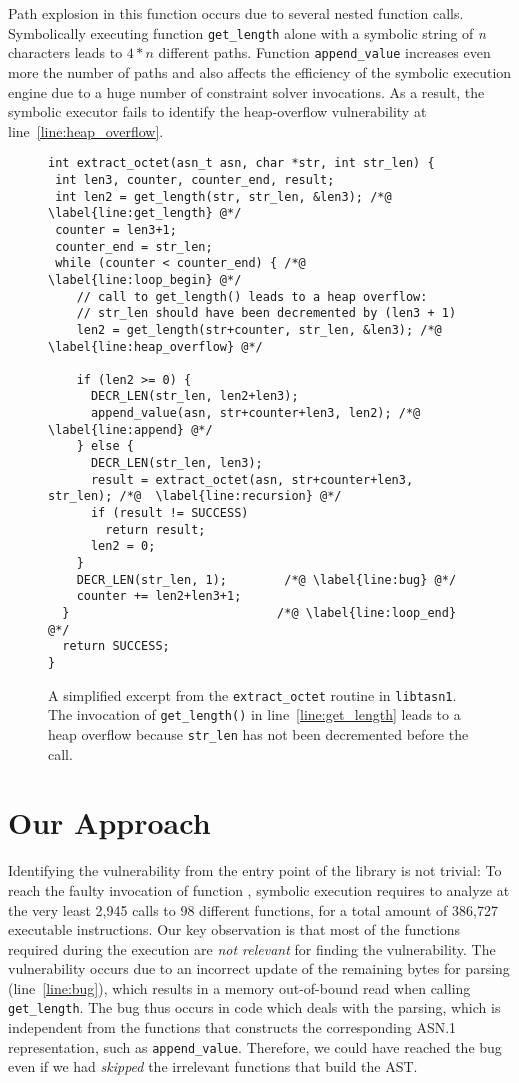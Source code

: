 Path explosion in this function occurs due to several nested function
calls. Symbolically executing function \texttt{get\_length} alone with
a symbolic string of \textit{n} characters leads to $4*n$ different
paths. Function \texttt{append\_value} increases even more the number
of paths and also affects the efficiency of the symbolic execution
engine due to a huge number of constraint solver invocations. As a
result, the symbolic executor fails to identify the heap-overflow
vulnerability at line~\ref{line:heap_overflow}.

\begin{figure}[tbp]
\begin{lstlisting}[linewidth=.99\columnwidth]
int extract_octet(asn_t asn, char *str, int str_len) {
 int len3, counter, counter_end, result;
 int len2 = get_length(str, str_len, &len3); /*@ \label{line:get_length} @*/
 counter = len3+1;
 counter_end = str_len;
 while (counter < counter_end) { /*@ \label{line:loop_begin} @*/
    // call to get_length() leads to a heap overflow:
    // str_len should have been decremented by (len3 + 1)
    len2 = get_length(str+counter, str_len, &len3); /*@ \label{line:heap_overflow} @*/

    if (len2 >= 0) {
      DECR_LEN(str_len, len2+len3);
      append_value(asn, str+counter+len3, len2); /*@ \label{line:append} @*/
    } else {
      DECR_LEN(str_len, len3);
      result = extract_octet(asn, str+counter+len3, str_len); /*@  \label{line:recursion} @*/
      if (result != SUCCESS)
        return result;
      len2 = 0;
    }
    DECR_LEN(str_len, 1);        /*@ \label{line:bug} @*/
    counter += len2+len3+1;
  }                             /*@ \label{line:loop_end} @*/
  return SUCCESS;
}
\end{lstlisting}
\caption{A simplified excerpt from the \texttt{extract\_octet} routine
  in \texttt{libtasn1}. The invocation of \texttt{get\_length()} in
  line~\ref{line:get_length} leads to a heap overflow because
  \texttt{str\_len} has not been decremented before the call.}
\label{fig:intro-example}
\end{figure}

\section{Our Approach}
Identifying the vulnerability from the entry point of the library is
not trivial: To reach the faulty invocation of function ,
symbolic execution requires to analyze at the very least 2,945 calls
to 98 different functions, for a total amount of 386,727 executable
instructions. Our key observation is that most of the functions
required during the execution are \textit{not relevant} for finding
the vulnerability. The vulnerability occurs due to an incorrect update
of the remaining bytes for parsing (line~\ref{line:bug}), which
results in a memory out-of-bound read when calling
\texttt{get\_length}. The bug thus occurs in code which deals with the
parsing, which is independent from the functions that constructs the
corresponding ASN.1 representation, such as \texttt{append\_value}.
Therefore, we could have reached the bug even if we had \emph{skipped}
the irrelevant functions that build the AST.

